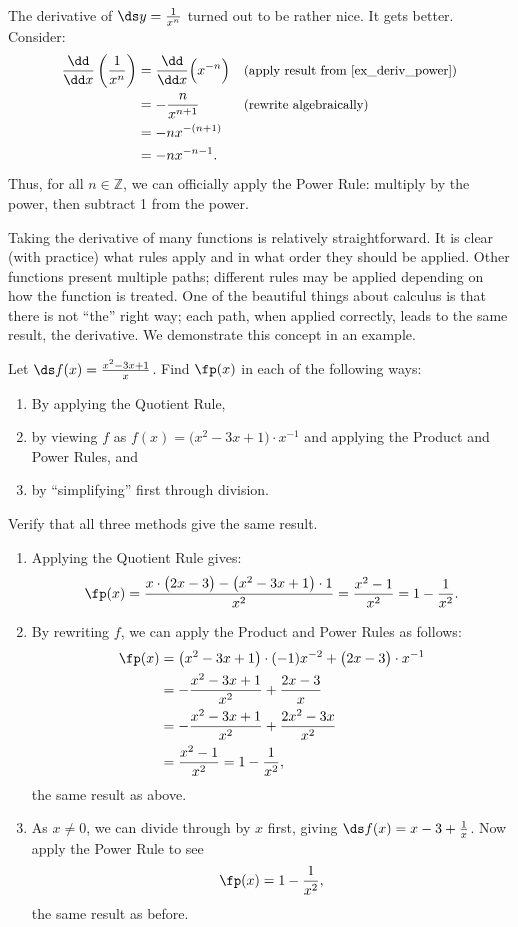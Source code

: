 The derivative of $\ds y=\frac{1}{x^n}$ turned out to be rather nice. It gets better. Consider:
\begin{align*}
	\frac{\dd}{\dd x}\left(\frac{1}{x^n}\right)
	&= \frac{\dd}{\dd x}\Bigl(x^{-n}\Bigr) &&
	\text{\small (apply result from \autoref{ex_deriv_power})}\\
	&= -\frac{n}{x^{n+1}} && \text{\small (rewrite algebraically)} \\
	&= -nx^{-(n+1)} \\
	&= -nx^{-n-1}.
\end{align*}
Thus, for all $n\in\mathbb{Z}$, we can officially apply the Power Rule: multiply by the power, then subtract 1 from the power.

Taking the derivative of many functions is relatively straightforward. It is clear (with practice) what rules apply and in what order they should be applied. Other functions present multiple paths; different rules may be applied depending on how the function is treated. One of the beautiful things about calculus is that there is not ``the'' right way; each path, when applied correctly, leads to the same result, the derivative. We demonstrate this concept in an example.

\begin{example}\label{ex_multiple_deriv}
Let $\ds f(x) = \frac{x^2-3x+1}{x}$. Find $\fp(x)$ in each of the following ways:
\begin{enumerate}
	\item	By applying the Quotient Rule,
	\item	by viewing $f$ as $f(x) = \bigl(x^2-3x+1\bigr)\cdot x^{-1}$ and applying the Product and Power Rules, and
	\item	by ``simplifying\primeskip'' first through division.
\end{enumerate}
Verify that all three methods give the same result.
\solution
\begin{enumerate}
	\item	Applying the Quotient Rule gives:
	\[\fp(x) = \frac{x\cdot\bigl(2x-3\bigr)-\bigl(x^2-3x+1\bigr)\cdot 1}{x^2} = \frac{x^2-1}{x^2} = 1-\frac{1}{x^2}.\]
	\item	By rewriting $f$, we can apply the Product and Power Rules as follows:
	\begin{align*}
		\fp(x)
		&= \bigl(x^2-3x+1\bigr)\cdot (-1)x^{-2} + \bigl(2x-3\bigr)\cdot x^{-1} \\
		&= -\frac{x^2-3x+1}{x^2}+\frac{2x-3}{x} \\
		&= -\frac{x^2-3x+1}{x^2}+\frac{2x^2-3x}{x^2}\\
		&= \frac{x^2-1}{x^2} = 1-\frac{1}{x^2},
	\end{align*}
	the same result as above.
	\item	As $x\neq 0$, we can divide through by $x$ first, giving $\ds f(x) = x-3+\frac{1}x$. Now apply the Power Rule to see
	\[\fp(x) = 1-\frac{1}{x^2},\]
	the same result as before.
\end{enumerate}
\end{example}


